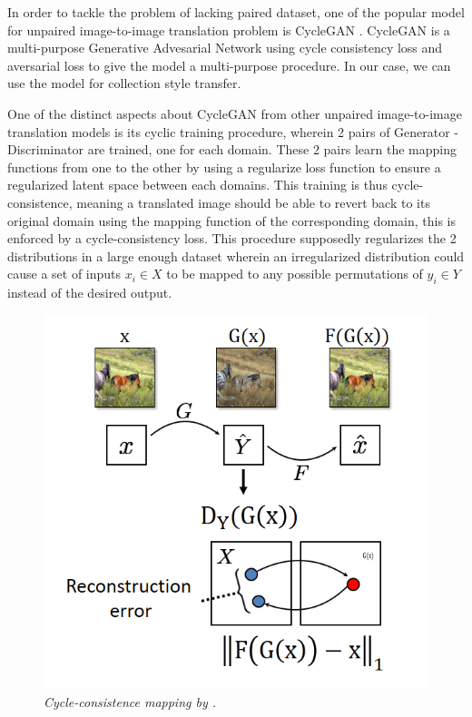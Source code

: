 \documentclass[12pt]{report}
\begin{document}
In order to tackle the problem of lacking paired dataset, one of the popular model for unpaired image-to-image translation problem is CycleGAN \cite{cycle-gan}. CycleGAN is a multi-purpose Generative Advesarial Network using cycle consistency loss and aversarial loss to give the model a multi-purpose procedure. In our case, we can use the model for collection style transfer.

One of the distinct aspects about CycleGAN\cite{cycle-gan} from other unpaired image-to-image translation models is its cyclic training procedure, wherein 2 pairs of Generator - Discriminator are trained, one for each domain. These 2 pairs learn the mapping functions from one to the other by using a regularize loss function to ensure a regularized latent space between each domains. This training is thus cycle-consistence, meaning a translated image should be able to revert back to its original domain using the mapping function of the corresponding domain, this is enforced by a cycle-consistency loss. This procedure supposedly regularizes the 2 distributions in a large enough dataset wherein an irregularized distribution could cause a set of inputs $x_i$$\in$$X$ to be mapped to any possible permutations of $y_i$$\in$$Y$ instead of the desired output.

\begin{figure}[H]
	\centering
	\includegraphics[scale=0.8]{cycle-consistence}
	\caption{\textit{Cycle-consistence mapping by \cite{cycle-gan}.}}
	\label{fig:cycle-consistence}
\end{figure}
\end{document}
